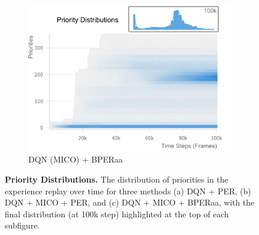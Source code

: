 \begin{figure}[H]
\begin{subfigure}{0.32\textwidth}
        \includegraphics[width=\linewidth]{Results/grid_world/priority_distribution_dqn_mico_bperaa.png}
        \caption{DQN (MICO) + BPERaa}
        \label{fig:priority_distribution_bperaa}
    \end{subfigure}
    \caption[Priority Distributions.]{\textbf{Priority Distributions.} The distribution of priorities in the experience replay over time for three methods (a) DQN + PER, (b) DQN + MICO + PER, and (c) DQN + MICO + BPERaa, with the final distribution (at 100k step) highlighted at the top of each subfigure.}
    \label{fig:priority_distributions}
\end{figure}



